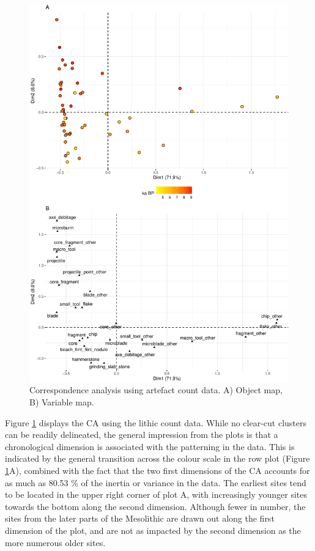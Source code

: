 \documentclass[
]{article}
\begin{document}
\begin{figure}
\centering
\includegraphics{../figures/cor-1.pdf}
\caption{\label{fig:cor}Correspondence analysis using artefact count data. A) Object map, B) Variable map.}
\end{figure}

Figure \ref{fig:cor} displays the CA using the lithic count data. While no clear-cut clusters can be readily delineated, the general impression from the plots is that a chronological dimension is associated with the patterning in the data. This is indicated by the general transition across the colour scale in the row plot (Figure \ref{fig:cor}A), combined with the fact that the two first dimensions of the CA accounts for as much as 80.53 \% of the inertia or variance in the data. The earliest sites tend to be located in the upper right corner of plot A, with increasingly younger sites towards the bottom along the second dimension. Although fewer in number, the sites from the later parts of the Mesolithic are drawn out along the first dimension of the plot, and are not as impacted by the second dimension as the more numerous older sites.
\end{document}
